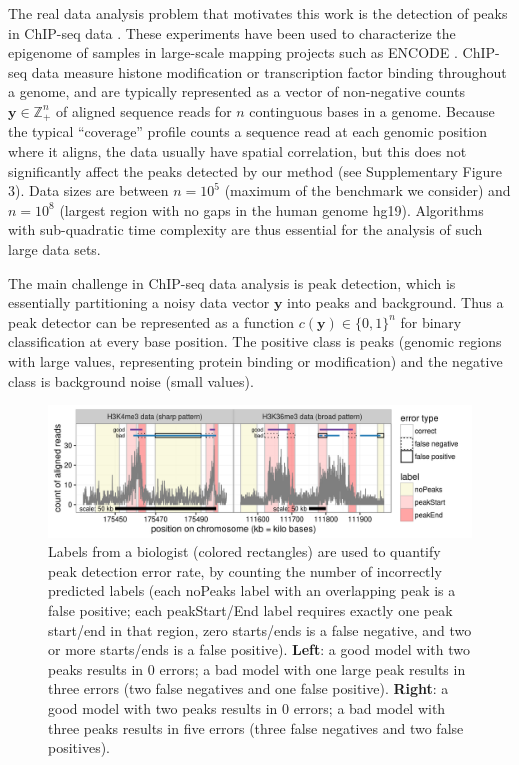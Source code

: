 \documentclass[aoas]{imsart}
\newcommand{\ZZ}{\mathbb Z}
\begin{document}
The real data analysis problem that motivates this work is the
detection of peaks in ChIP-seq data \citep{practical}. These
experiments have been used to characterize the epigenome of samples in
large-scale mapping projects such as ENCODE \citep{ENCODE}. ChIP-seq
data measure histone modification or transcription factor binding
throughout a genome, and are typically represented as a vector of
non-negative counts $\mathbf y\in\ZZ_+^n$ of aligned sequence reads
for $n$ continguous bases in a genome. Because the typical
``coverage'' profile counts a sequence read at each genomic position
where it aligns, the data usually have spatial correlation, but
this does not significantly affect the peaks detected by our method
(see Supplementary Figure 3). Data sizes are between $n=10^5$ (maximum
of the benchmark we consider) and $n=10^8$ (largest region with no
gaps in the human genome hg19). Algorithms with sub-quadratic time
complexity are thus essential for the analysis of such large data
sets.

The main challenge in ChIP-seq data analysis is peak detection, which
is essentially partitioning a noisy data vector $\mathbf y$ into peaks and
background. Thus a peak detector can be represented as a function
$c(\mathbf y)\in\{0,1\}^n$ for binary classification at every base
position. The positive class is peaks (genomic regions with large
values, representing protein binding or modification) and the negative
class is background noise (small values).

\begin{figure}[t!]
  \centering
  \includegraphics[width=\textwidth]{figure-good-bad}
\vskip -0.5cm
\caption{Labels from a biologist (colored rectangles) are used to 
  quantify peak detection error rate, by counting the
  number of incorrectly predicted labels
  (each noPeaks label with an overlapping
  peak is a false positive; each peakStart/End label requires exactly
  one peak start/end in that region, zero starts/ends is a false
  negative, and two or more starts/ends is a false positive).
  \textbf{Left}: a \textcolor{good}{good} model with two peaks results in 0 errors; a
  \textcolor{bad}{bad} model with one large peak results in three errors (two false negatives and one false positive).
  \textbf{Right}: a \textcolor{good}{good} model with two peaks results in 0 errors; a
  \textcolor{bad}{bad} model with three peaks results in five errors (three false negatives and two false positives).
}
  \label{fig:good-bad}
\end{figure}
\end{document}
